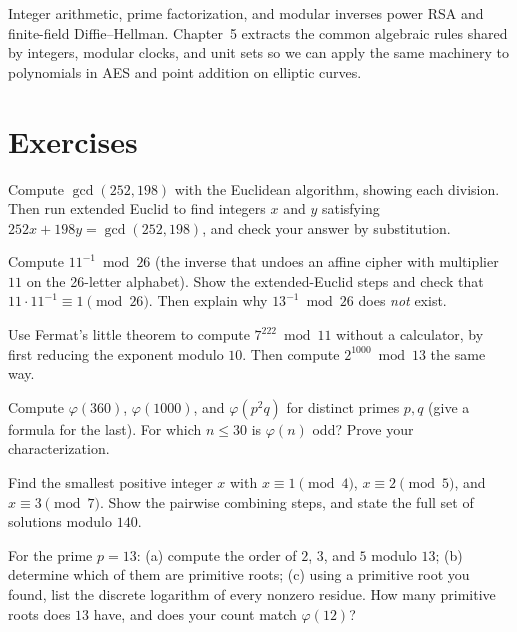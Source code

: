 Integer arithmetic, prime factorization, and modular inverses power RSA and finite-field
Diffie--Hellman. Chapter~5 extracts the common algebraic rules shared by integers, modular clocks,
and unit sets so we can apply the same machinery to polynomials in AES and point addition on
elliptic curves.

\section{Exercises}
\label{ch04:exercises}

\begin{exercise}
Compute $\gcd(252, 198)$ with the Euclidean algorithm, showing each division. Then run extended
Euclid to find integers $x$ and $y$ satisfying $252x + 198y = \gcd(252, 198)$, and check your
answer by substitution.
\end{exercise}

\begin{exercise}
Compute $11^{-1} \bmod 26$ (the inverse that undoes an affine cipher with multiplier $11$ on the
26-letter alphabet). Show the extended-Euclid steps and check that $11 \cdot 11^{-1} \equiv 1
\pmod{26}$. Then explain why $13^{-1} \bmod 26$ does \emph{not} exist.
\end{exercise}

\begin{exercise}
Use Fermat's little theorem to compute $7^{222} \bmod 11$ without a calculator, by first reducing
the exponent modulo $10$. Then compute $2^{1000} \bmod 13$ the same way.
\end{exercise}

\begin{exercise}
Compute $\varphi(360)$, $\varphi(1000)$, and $\varphi(p^2 q)$ for distinct primes $p, q$ (give a
formula for the last). For which $n \le 30$ is $\varphi(n)$ odd? Prove your characterization.
\end{exercise}

\begin{exercise}
Find the smallest positive integer $x$ with $x \equiv 1 \pmod 4$, $x \equiv 2 \pmod 5$, and
$x \equiv 3 \pmod 7$. Show the pairwise combining steps, and state the full set of solutions modulo
$140$.
\end{exercise}

\begin{exercise}
For the prime $p = 13$: (a) compute the order of $2$, $3$, and $5$ modulo $13$; (b) determine which
of them are primitive roots; (c) using a primitive root you found, list the discrete logarithm of
every nonzero residue. How many primitive roots does $13$ have, and does your count match
$\varphi(12)$?
\end{exercise}

